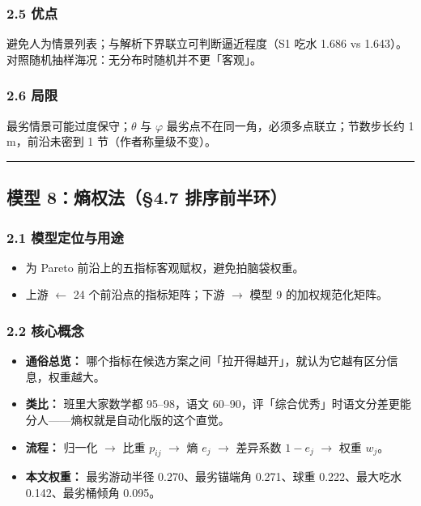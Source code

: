 \documentclass[UTF8,a4paper,zihao=-4]{ctexart}
\begin{document}
\subsubsection{\texorpdfstring{2.5 优点}{2.5 优点}}
避免人为情景列表；与解析下界联立可判断逼近程度（S1 吃水 1.686 vs 1.643）。对照随机抽样海况：无分布时随机并不更「客观」。

\subsubsection{\texorpdfstring{2.6 局限}{2.6 局限}}
最劣情景可能过度保守；\(\theta\) 与 \(\varphi\) 最劣点不在同一角，必须多点联立；节数步长约 1 m，前沿未密到 1 节（作者称量级不变）。

\vspace{0.4em}\hrule\vspace{0.4em}

\subsection{\texorpdfstring{模型 8：熵权法（§4.7 排序前半环）}{模型 8：熵权法（§4.7 排序前半环）}}

\subsubsection{\texorpdfstring{2.1 模型定位与用途}{2.1 模型定位与用途}}
\begin{itemize}[leftmargin=1.5em]
\item 为 Pareto 前沿上的五指标客观赋权，避免拍脑袋权重。
\item 上游 $\leftarrow$ 24 个前沿点的指标矩阵；下游 $\rightarrow$ 模型 9 的加权规范化矩阵。
\end{itemize}

\subsubsection{\texorpdfstring{2.2 核心概念}{2.2 核心概念}}
\begin{itemize}[leftmargin=1.5em]
\item \textbf{通俗总览：} 哪个指标在候选方案之间「拉开得越开」，就认为它越有区分信息，权重越大。
\item \textbf{类比：} 班里大家数学都 95--98，语文 60--90，评「综合优秀」时语文分差更能分人------熵权就是自动化版的这个直觉。
\item \textbf{流程：} 归一化 $\rightarrow$ 比重 \(p_{ij}\) $\rightarrow$ 熵 \(e_j\) $\rightarrow$ 差异系数 \(1-e_j\) $\rightarrow$ 权重 \(w_j\)。
\item \textbf{本文权重：} 最劣游动半径 0.270、最劣锚端角 0.271、球重 0.222、最大吃水 0.142、最劣桶倾角 0.095。
\end{itemize}
\end{document}
